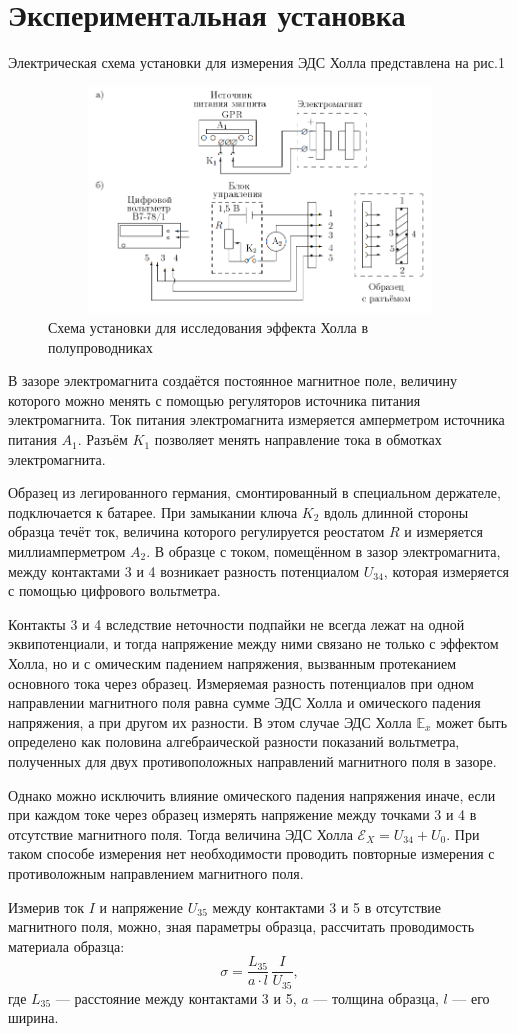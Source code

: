 \documentclass[12pt]{article}
\begin{document}
\section*{Экспериментальная установка}
	Электрическая схема установки для измерения ЭДС Холла представлена на рис.1
\begin{figure}[h!]
	\centering
	\includegraphics[height = 6cm, width = 12cm]{image1.png}
	\caption{Схема установки для исследования эффекта Холла в полупроводниках}
\end{figure}
\par
	В зазоре электромагнита создаётся постоянное магнитное поле, величину которого можно менять с помощью регуляторов источника питания электромагнита. Ток питания электромагнита измеряется амперметром источника питания $A_1$. Разъём $K_1$ позволяет менять направление тока в обмотках электромагнита.
\par
	Образец из легированного германия, смонтированный в специальном держателе, подключается к батарее. При замыкании ключа $K_2$ вдоль длинной стороны образца течёт ток, величина которого регулируется реостатом $R$ и измеряется миллиамперметром $A_2$. В образце с током, помещённом в зазор электромагнита, между контактами 3 и 4 возникает разность потенциалом $U_\text{34}$, которая измеряется с помощью цифрового вольтметра.
\par
	Контакты 3 и 4 вследствие неточности подпайки не всегда лежат на одной эквипотенциали, и тогда напряжение между ними связано не только с эффектом Холла, но и с омическим падением напряжения, вызванным протеканием основного тока через образец. Измеряемая разность потенциалов при одном направлении магнитного поля равна сумме ЭДС Холла и омического падения напряжения, а при другом их разности. В этом случае ЭДС Холла $\mathbb{E}_x$ может быть определено как половина алгебраической разности показаний вольтметра, полученных для двух противоположных направлений магнитного поля в зазоре.
\par
	Однако можно исключить влияние омического падения напряжения иначе, если при каждом токе через образец измерять напряжение между точками 3 и 4 в отсутствие магнитного поля. Тогда величина ЭДС Холла $\mathscr{E}_X = U_\text{34} + U_0$. При таком способе измерения нет необходимости проводить повторные измерения с противоложным направлением магнитного поля.
\par
	Измерив ток $I$ и напряжение $U_\text{35}$ между контактами 3 и 5 в отсутствие магнитного поля, можно, зная параметры образца, рассчитать проводимость материала образца:
\[
	\sigma = \frac{L_\text{35}}{a \cdot l} \, \frac{I}{U_\text{35}},
\]		 		 			
где $L_\text{35}$ --- расстояние между контактами 3 и 5, $a$ --- толщина образца, $l$ --- его ширина.
\end{document}
